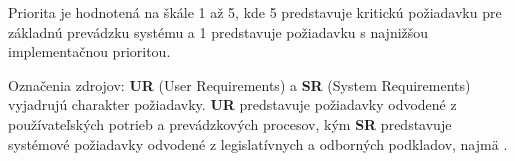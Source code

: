 \noindent
Priorita je hodnotená na škále 1 až 5, kde 5 predstavuje kritickú požiadavku pre základnú prevádzku systému a 1 predstavuje požiadavku s najnižšou implementačnou prioritou.

\noindent
Označenia zdrojov: \textbf{UR} (User Requirements) a \textbf{SR} (System Requirements) vyjadrujú charakter požiadavky. \textbf{UR} predstavuje požiadavky odvodené z používateľských potrieb a prevádzkových procesov, kým \textbf{SR} predstavuje systémové požiadavky odvodené z legislatívnych a odborných podkladov, najmä \cite{EUDWD2020,SKVyhlaska912023,CarricoFerreira2021}.
